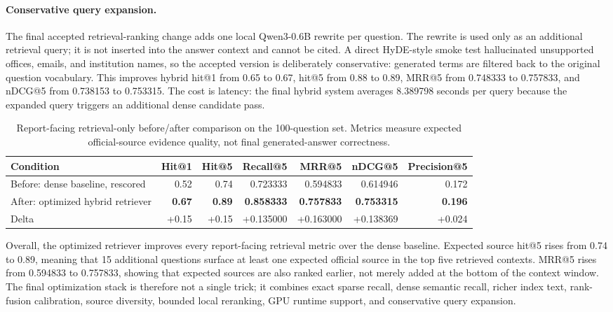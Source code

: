 \documentclass{article}
\begin{document}
\begin{CJK*}{UTF8}{gbsn}
\paragraph{Conservative query expansion.}
The final accepted retrieval-ranking change adds one local Qwen3-0.6B rewrite per question. The rewrite is used only as an additional retrieval query; it is not inserted into the answer context and cannot be cited. A direct HyDE-style smoke test hallucinated unsupported offices, emails, and institution names, so the accepted version is deliberately conservative: generated terms are filtered back to the original question vocabulary. This improves hybrid hit@1 from 0.65 to 0.67, hit@5 from 0.88 to 0.89, MRR@5 from 0.748333 to 0.757833, and nDCG@5 from 0.738153 to 0.753315. The cost is latency: the final hybrid system averages 8.389798 seconds per query because the expanded query triggers an additional dense candidate pass.

\begin{table}[H]
\centering
\scriptsize
\setlength{\tabcolsep}{3.5pt}
\caption{Report-facing retrieval-only before/after comparison on the 100-question set. Metrics measure expected official-source evidence quality, not final generated-answer correctness.}
\label{tab:retrieval-main}
\begin{tabular}{lrrrrrr}
\toprule
Condition & Hit@1 & Hit@5 & Recall@5 & MRR@5 & nDCG@5 & Precision@5 \\
\midrule
Before: dense baseline, rescored & 0.52 & 0.74 & 0.723333 & 0.594833 & 0.614946 & 0.172 \\
After: optimized hybrid retriever & \textbf{0.67} & \textbf{0.89} & \textbf{0.858333} & \textbf{0.757833} & \textbf{0.753315} & \textbf{0.196} \\
Delta & +0.15 & +0.15 & +0.135000 & +0.163000 & +0.138369 & +0.024 \\
\bottomrule
\end{tabular}
\end{table}

Overall, the optimized retriever improves every report-facing retrieval metric over the dense baseline. Expected source hit@5 rises from 0.74 to 0.89, meaning that 15 additional questions surface at least one expected official source in the top five retrieved contexts. MRR@5 rises from 0.594833 to 0.757833, showing that expected sources are also ranked earlier, not merely added at the bottom of the context window. The final optimization stack is therefore not a single trick; it combines exact sparse recall, dense semantic recall, richer index text, rank-fusion calibration, source diversity, bounded local reranking, GPU runtime support, and conservative query expansion.


\end{CJK*}
\end{document}
